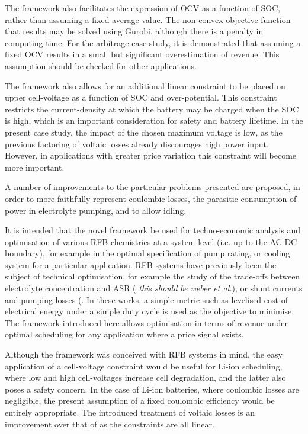 \documentclass[preprint,3p,review,authoryear,10pt]{elsarticle}
\begin{document}
The framework also facilitates the expression of OCV as a function of SOC, rather than assuming a fixed average value. The non-convex objective function that results may be solved using Gurobi, although there is a penalty in computing time. For the arbitrage case study, it is demonstrated that assuming a fixed OCV results in a small but significant overestimation of revenue. This assumption should be checked for other applications.

The framework also allows for an additional linear constraint to be placed on upper cell-voltage as a function of SOC and over-potential. This constraint restricts the current-density at which the battery may be charged when the SOC is high, which is an important consideration for safety and battery lifetime. In the present case study, the impact of the chosen maximum voltage is low, as the previous factoring of voltaic losses already discourages high power input. However, in applications with greater price variation this constraint will become more important. 

A number of improvements to the particular problems presented are proposed, in order to more faithfully represent coulombic losses, the parasitic consumption of power in electrolyte pumping, and to allow idling.

It is intended that the novel framework be used for techno-economic analysis and optimisation of various RFB chemistries at a system level (i.e. up to the AC-DC boundary), for example in the optimal specification of pump rating, or cooling system for a particular application. RFB systems have previously been the subject of technical optimisation, for example the study of the trade-offs between electrolyte concentration and ASR (\cite{Weber2013} \emph{this should be weber et al.}), or shunt currents and pumping losses (\cite{Viswanathan2014}. In these works, a simple metric such as levelised cost of electrical energy under a simple duty cycle is used as the objective to minimise. The framework introduced here allows optimisation in terms of revenue under optimal scheduling for any application where a price signal exists.

Although the framework was conceived with RFB systems in mind, the easy application of a cell-voltage constraint would be useful for Li-ion scheduling, where low and high cell-voltages increase cell degradation, and the latter also poses a safety concern. In the case of Li-ion batteries, where coulombic losses are negligible, the present assumption of a fixed coulombic efficiency would be entirely appropriate. The introduced treatment of voltaic losses is an improvement over that of \cite{Sarker2017} as the constraints are all linear.
\end{document}
